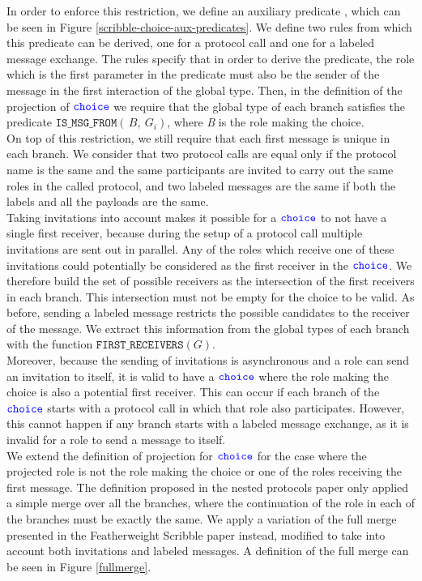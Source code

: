 \documentclass[12pt,twoside]{report}
\begin{document}
In order to enforce this restriction, we define an auxiliary predicate \texttt{}, which can be seen in Figure \ref{scribble-choice-aux-predicates}. We define two rules from which this predicate can be derived, one for a protocol call and one for a labeled message exchange. The rules specify that in order to derive the predicate, the role which is the first parameter in the predicate must also be the sender of the message in the first interaction of the global type. Then, in the definition of the projection of ${\color{blue}\mathtt{choice}}$ we require that the global type of each branch satisfies the predicate $\mathtt{IS\_MSG\_FROM}(\,B,\ G_i)$, where \textit{B} is the role making the choice.\\

On top of this restriction, we still require that each first message is unique in each branch. We consider that two protocol calls are equal only if the protocol name is the same and the same participants are invited to carry out the same roles in the called protocol, and two labeled messages are the same if both the labels and all the payloads are the same.\\

Taking invitations into account makes it possible for a ${\color{blue}\mathtt{choice}}$ to not have a single first receiver, because during the setup of a protocol call multiple invitations are sent out in parallel. Any of the roles which receive one of these invitations could potentially be considered as the first receiver in the ${\color{blue}\mathtt{choice}}$. We therefore build the set of possible receivers as the intersection of the first receivers in each branch. This intersection must not be empty for the choice to be valid. As before, sending a labeled message restricts the possible candidates to the receiver of the message. We extract this information from the global types of each branch with the function $\mathtt{FIRST\_RECEIVERS}(G)$.\\

Moreover, because the sending of invitations is asynchronous and a role can send an invitation to itself, it is valid to have a ${\color{blue}\mathtt{choice}}$ where the role making the choice is also a potential first receiver. This can occur if each branch of the ${\color{blue}\mathtt{choice}}$ starts with a protocol call in which that role also participates. However, this cannot happen if any branch starts with a labeled message exchange, as it is invalid for a role to send a message to itself.\\


We extend the definition of projection for ${\color{blue}\mathtt{choice}}$ for the case where the projected role is not the role making the choice  or one of the roles receiving the first message. The definition proposed in the nested protocols paper only applied a simple merge over all the branches, where the continuation of the role in each of the branches must be exactly the same. We apply a variation of the full merge presented in the Featherweight Scribble paper\cite{featherweight} instead, modified to take into account both invitations and labeled messages. A definition of the full merge can be seen in Figure \ref{fullmerge}.\\
\end{document}
